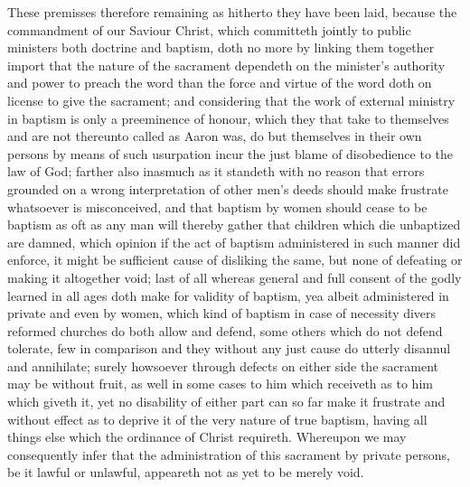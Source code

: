 These premisses therefore remaining as hitherto they have been laid, because the commandment of our Saviour Christ, which committeth jointly to public ministers both doctrine and baptism, doth no more by linking them together import that the nature of the sacrament dependeth on the minister’s authority and power to preach the word than the force and virtue of the word doth on license to give the sacrament; and considering that the work of external ministry in baptism is only a preeminence of honour, which they that take to themselves and are not thereunto called as Aaron was, do but themselves in their own persons by means of such usurpation incur the just blame of disobedience to the law of God; farther also inasmuch as it standeth with no  reason that errors grounded on a wrong interpretation of other men’s deeds should make frustrate whatsoever is misconceived, and that baptism by women should cease to be baptism as oft as any man will thereby gather that children which die unbaptized are damned, which opinion if the act of baptism administered in such manner did enforce, it might be sufficient cause of disliking the same, but none of defeating or making it altogether void; last of all whereas general and full consent of the godly learned in all ages doth make for validity of baptism, yea albeit administered in private and even by women, which kind of baptism in case of necessity divers reformed churches do both allow and defend, some others which do not defend tolerate, few in comparison and they without any just cause do utterly disannul and annihilate; surely howsoever through defects on either side the sacrament may be without fruit, as well in some cases to him which receiveth as to him which giveth it, yet no disability of either part can so far make it frustrate and without effect as to deprive it of the very nature of true baptism, having all things else which the ordinance of Christ requireth. Whereupon we may consequently infer that the administration of this sacrament by private persons, be it lawful or unlawful, appeareth not as yet to be merely void.


